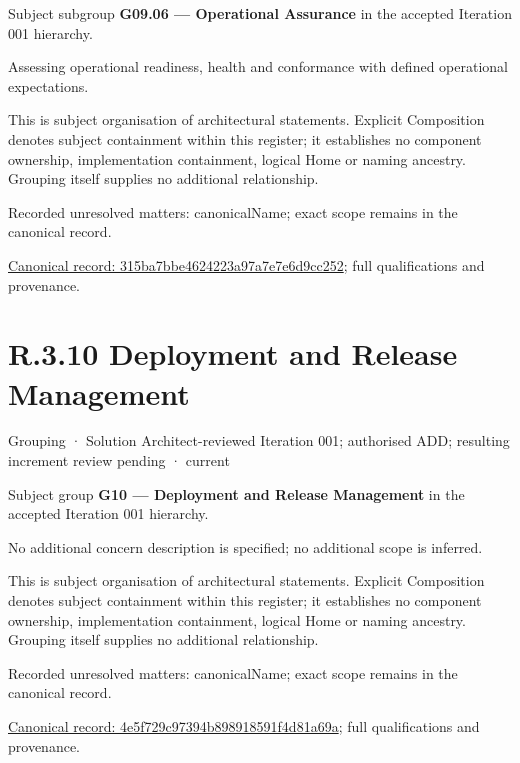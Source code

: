 Subject subgroup \textbf{G09.06 — Operational Assurance} in the accepted Iteration 001 hierarchy.



Assessing operational readiness, health and conformance with defined operational expectations.



This is subject organisation of architectural statements. Explicit Composition denotes subject containment within this register; it establishes no component ownership, implementation containment, logical Home or naming ancestry. Grouping itself supplies no additional relationship.


{\small Recorded unresolved matters: canonicalName; exact scope remains in the canonical record.}\par
{\footnotesize \href{../../../../continuum/grouping/315ba7bbe4624223a97a7e7e6d9cc252.md}{Canonical record: 315ba7bbe4624223a97a7e7e6d9cc252}; full qualifications and provenance.}\par
\section*{R.3.10 Deployment and Release Management}
\label{navigation:R.3.10}

\label{element:4e5f729c97394b898918591f4d81a69a}
{\small Grouping · Solution Architect-reviewed Iteration 001; authorised ADD; resulting increment review pending · current}\par

Subject group \textbf{G10 — Deployment and Release Management} in the accepted Iteration 001 hierarchy.



No additional concern description is specified; no additional scope is inferred.



This is subject organisation of architectural statements. Explicit Composition denotes subject containment within this register; it establishes no component ownership, implementation containment, logical Home or naming ancestry. Grouping itself supplies no additional relationship.


{\small Recorded unresolved matters: canonicalName; exact scope remains in the canonical record.}\par
{\footnotesize \href{../../../../continuum/grouping/4e5f729c97394b898918591f4d81a69a.md}{Canonical record: 4e5f729c97394b898918591f4d81a69a}; full qualifications and provenance.}\par
